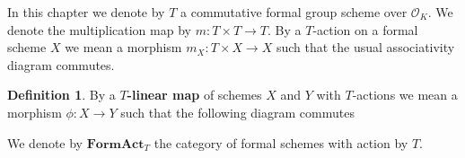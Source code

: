 \documentclass[10pt,oneside]{amsart}
\theoremstyle{definition}
\newtheorem{definition}[theorem]{Definition}
\begin{document}
	In this chapter we denote by $T$ a commutative formal group scheme over $\mathcal O_K$. We denote the multiplication map by $m:T\times T\rightarrow T$. By a $T$-action on a formal scheme $X$ we mean a morphism $m_X:T\times X\rightarrow X$ such that the usual associativity diagram commutes. 
	\begin{definition}
		By a \textbf{$T$-linear map} of schemes $X$ and $Y$ with $T$-actions we mean a morphism $\phi:X\rightarrow Y$ such that the following diagram commutes
		\begin{center}
		\end{center}
		We denote by $\mathbf{FormAct}_T$ the category of formal schemes with action by $T$.
	\end{definition}
	
\end{document}
